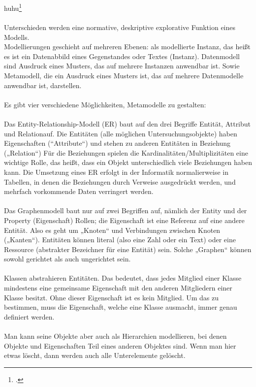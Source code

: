 \documentclass[12pt,a4paper]{article}
\begin{document}
\\
\\
huhu\footcite[Vgl][S.99-108]{jannidis2017digital} 
\\
\\
Unterschieden werden eine normative, deskriptive  explorative Funktion eines Modells.
\\
Modellierungen geschieht auf mehreren Ebenen: als modellierte Instanz, das heißt es ist ein Datenabbild eines Gegenstandes oder Textes (Instanz). Datenmodell sind Ausdruck eines Musters, das auf mehrere Instanzen anwendbar ist. Sowie Metamodell, die ein Ausdruck eines Musters ist, das auf mehrere Datenmodelle anwendbar ist, darstellen.
\\
\\
Es gibt vier verschiedene Möglichkeiten, Metamodelle zu gestalten:
\\
\\
Das Entity-Relationship-Modell (ER) baut auf den drei Begriffe Entität, Attribut und Relationauf. Die Entitäten (alle möglichen Untersuchungsobjekte) haben Eigenschaften (“Attribute“) und stehen zu anderen Entitäten in Beziehung („Relation“) Für die Beziehungen spielen die Kardinalitäten/Multiplizitäten eine wichtige Rolle, das heißt, dass ein Objekt unterschiedlich viele Beziehungen haben kann. Die Umsetzung eines ER erfolgt in der Informatik normalierweise in Tabellen, in denen die Beziehungen durch Verweise ausgedrückt werden, und mehrfach vorkommende Daten verringert werden.
\\
\\
Das Graphenmodell baut nur auf zwei Begriffen auf, nämlich der Entity und der Property (Eigenschaft) Rollen; die Eigenschaft ist eine Referenz auf eine andere Entität. Also es geht um „Knoten“ und Verbindungen zwischen Knoten („Kanten“). Entitäten können literal (also eine Zahl oder ein Text) oder eine Ressource (abstrakter Bezeichner für eine Entität) sein. Solche „Graphen“ können sowohl gerichtet als auch ungerichtet sein.
\\
\\
Klassen abstrahieren Entitäten. Das bedeutet, dass jedes Mitglied einer Klasse mindestens eine gemeinsame Eigenschaft mit den anderen Mitgliedern einer Klasse besitzt. Ohne dieser Eigenschaft ist es kein Mitglied. Um das zu bestimmen, muss die Eigenschaft, welche eine Klasse ausmacht, immer genau definiert werden.
\\
\\
Man kann seine Objekte aber auch als Hierarchien modellieren, bei denen Objekte und Eigenschaften Teil eines anderen Objektes sind. Wenn man hier etwas löscht, dann werden auch alle Unterelemente gelöscht.
\end{document}
